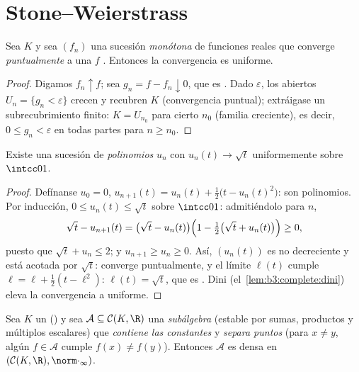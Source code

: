 \section{Stone--Weierstrass}

\begin{lemma}[Dini]\label{lem:b3:complete:dini}
Sea $K$  y sea $(f_n)$ una
sucesión \emph{monótona} de funciones reales
 que converge
\emph{puntualmente} a una $f$
. Entonces la convergencia
es uniforme.
\end{lemma}

\begin{proof}
Digamos $f_n \uparrow f$; sea $g_n = f - f_n \downarrow 0$, que es
. Dado $\varepsilon$, los
abiertos $U_n = \{g_n <
\varepsilon\}$ crecen y recubren $K$ (convergencia puntual); extráigase
un subrecubrimiento finito: $K = U_{n_0}$ para cierto $n_0$ (familia
creciente), es decir, $0 \leq g_n < \varepsilon$ en todas partes para
$n \geq n_0$.
\end{proof}

\begin{lemma}\label{lem:b3:complete:sqrt}
Existe una sucesión de \emph{polinomios} $u_n$ con $u_n(t) \to
\sqrt t$ uniformemente sobre $\intcc01$.
\end{lemma}

\begin{proof}
Defínanse $u_0 = 0$, $u_{n+1}(t) = u_n(t) + \frac12\bigl(t -
u_n(t)^2\bigr)$: son polinomios. Por inducción, $0 \leq u_n(t) \leq
\sqrt t$ sobre $\intcc01$: admitiéndolo para $n$,
\[
\sqrt t - u_{n+1}(t) = \bigl(\sqrt t - u_n(t)\bigr)
\Bigl(1 - \tfrac12\bigl(\sqrt t + u_n(t)\bigr)\Bigr) \geq 0,
\]
puesto que $\sqrt t + u_n \leq 2$; y $u_{n+1} \geq u_n \geq 0$. Así,
$(u_n(t))$ es no decreciente y está acotada por $\sqrt t$: converge
puntualmente, y el límite $\ell(t)$ cumple $\ell =
\ell + \frac12(t - \ell^2)$: $\ell(t) = \sqrt t$, que es
. Dini
(el~\cref{lem:b3:complete:dini}) eleva la convergencia a uniforme.
\end{proof}

\begin{theorem}
\label{thm:b3:complete:stoneweierstrass}
Sea $K$ un 
() y sea
$\mathcal A \subseteq
\mathcal C(K, \R)$ una \emph{subálgebra} (estable por sumas, productos y
múltiplos escalares) que \emph{contiene las constantes} y \emph{separa
puntos} (para $x \neq y$, algún $f \in
\mathcal A$ cumple $f(x) \neq f(y)$). Entonces $\mathcal A$ es densa en
$(\mathcal C(K,\R), \norm\cdot_\infty)$.
\end{theorem}

